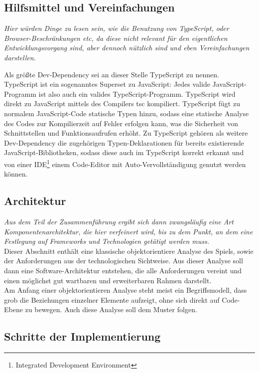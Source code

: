 \subsection{Hilfsmittel und Vereinfachungen}
\label{subsec:Hilfsmittel}

\emph{Hier würden Dinge zu lesen sein, wie die Benutzung von TypeScript, oder Browser-Beschränkungen etc, da diese nicht relevant für den eigentlichen Entwicklungsvorgang sind, aber dennoch nützlich sind und eben Vereinfachungen darstellen.}

Als größte Dev-Dependency sei an dieser Stelle TypeScript zu nennen. TypeScript ist ein sogenanntes Superset zu JavaScript: Jedes valide JavaScript-Programm ist also auch ein valides TypeScript-Programm. TypeScript wird direkt zu JavaScript mittels des Compilers tsc kompiliert. TypeScript fügt zu normalem JavaScript-Code statische Typen hinzu, sodass eine statische Analyse des Codes zur Kompilierzeit auf Fehler erfolgen kann, was die Sicherheit von Schnittstellen und Funktionsaufrufen erhöht. Zu TypeScript gehören als weitere Dev-Dependency die zugehörigen Typen-Deklarationen für bereits existierende JavaScript-Bibliotheken, sodass diese auch im TypeScript korrekt erkannt und von einer IDE\footnote{Integrated Development Environment} \bzw einem Code-Editor mit Auto-Vervollständigung genutzt werden können.
\subsection{Architektur}
\label{subsec:Architektur}

\emph{Aus dem Teil der Zusammenführung ergibt sich dann zwangsläufig eine Art Komponentenarchitektur, die hier verfeinert wird, bis zu dem Punkt, an dem eine Festlegung auf Frameworks und Technologien getätigt werden muss.}\\
Dieser Abschnitt enthält eine klassische objektorientiere Analyse des Spiels, sowie der Anforderungen aus der technologischen Sichtweise. Aus dieser Analyse soll dann eine Software-Architektur entstehen, die alle Anforderungen vereint und einen möglichst gut wartbaren und erweiterbaren Rahmen darstellt.\\
Am Anfang einer objektorientieren Analyse steht meist ein Begriffsmodell, dass grob die Beziehungen einzelner Elemente aufzeigt, ohne sich direkt auf Code-Ebene zu bewegen. Auch diese Analyse soll dem Muster folgen. 

\subsection{Schritte der Implementierung}
\label{subsec:Implementierung}

